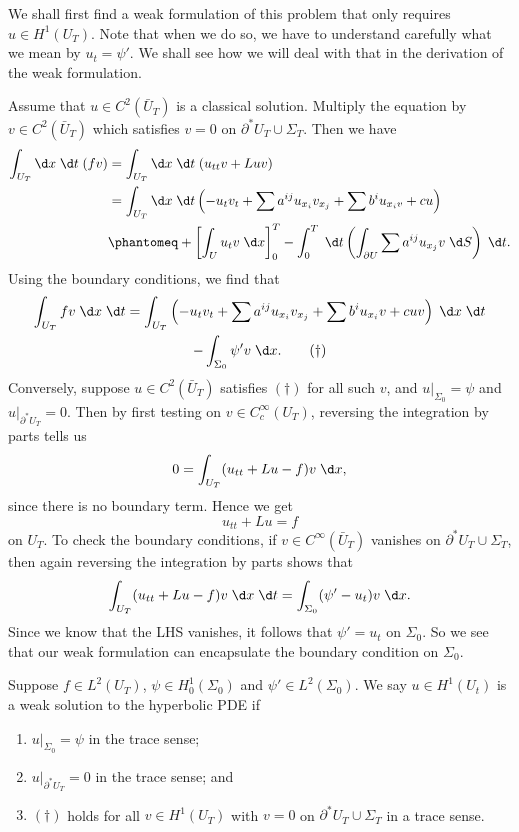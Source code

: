 \documentclass[a4paper]{article}
\begin{document}
We shall first find a weak formulation of this problem that only requires $u \in H^1(U_T)$. Note that when we do so, we have to understand carefully what we mean by $u_t = \psi'$. We shall see how we will deal with that in the derivation of the weak formulation.

Assume that $u \in C^2(\bar{U}_T)$ is a classical solution. Multiply the equation by $v \in C^2(\bar{U}_T)$ which satisfies $v = 0$ on $\partial^* U_T \cup \Sigma_T$. Then we have
\begin{align*}
  \int_{U_T} \d x\;\d t\; (fv) &= \int_{U_T} \d x\;\d t\; (u_{tt}v + Luv)\\
  &= \int_{U_T} \d x\;\d t\left(-u_t v_t + \sum a^{ij} u_{x_i} v_{x_j} + \sum b^i u_{x_i v} + cu\right)\\
  &\phantomeq + \left[\int_U u_t v \;\d x\right]_0^T - \int_0^T \;\d t \left(\int_{\partial U} \sum a^{ij} u_{x_j} v\;\d S\right)\;\d t.
\end{align*}
Using the boundary conditions, we find that
\begin{multline*}
  \int_{U_T} fv\;\d x \;\d t = \int_{U_T} \left(-u_t v_t + \sum a^{ij} u_{x_i} v_{x_j} + \sum b^i u_{x_i} v + cuv \right)\;\d x\;\d t \\
  - \int_{\Sigma_0} \psi' v\;\d x.\tag{$\dagger$}
\end{multline*}
Conversely, suppose $u \in C^2(\bar{U}_T)$ satisfies $(\dagger)$ for all such $v$, and $u|_{\Sigma_0} = \psi$ and $u|_{\partial^* U_T} = 0$. Then by first testing on $v \in C_c^\infty(U_T)$, reversing the integration by parts tells us
\[
  0 = \int_{U_T} (u_{tt} + Lu - f)v\;\d x,
\]
since there is no boundary term. Hence we get
\[
  u_{tt} + Lu = f
\]
on $U_T$. To check the boundary conditions, if $v \in C^\infty(\bar{U}_T)$ vanishes on $\partial^*U_T \cup \Sigma_T$, then again reversing the integration by parts shows that
\[
  \int_{U_T} (u_{tt} + Lu - f) v\;\d x \;\d t = \int_{\Sigma_0} (\psi' - u_t) v\;\d x.
\]
Since we know that the LHS vanishes, it follows that $\psi' = u_t$ on $\Sigma_0$. So we see that our weak formulation can encapsulate the boundary condition on $\Sigma_0$.

\begin{defi}
  Suppose $f \in L^2(U_T)$, $\psi \in H_0^1(\Sigma_0)$ and $\psi' \in L^2(\Sigma_0)$. We say $u \in H^1(U_t)$ is a weak solution to the hyperbolic PDE if
  \begin{enumerate}
    \item $u|_{\Sigma_0} = \psi$ in the trace sense;
    \item $u|_{\partial^* U_T} = 0$ in the trace sense; and
    \item $(\dagger)$ holds for all $v \in H^1(U_T)$ with $v = 0$ on $\partial^* U_T \cup \Sigma_T$ in a trace sense.
  \end{enumerate}
\end{defi}
\end{document}

